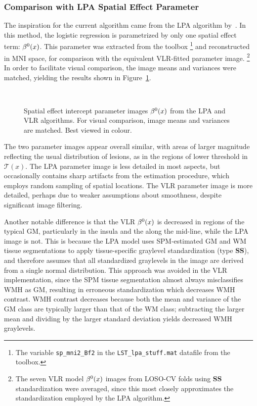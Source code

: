 \subsubsection{Comparison with LPA Spatial Effect Parameter}\label{sss:exp-beta-lpa}
The inspiration for the current algorithm came from the LPA algorithm by~\citeauthor{Schmidt2017}.
In this method, the logistic regression is parametrized by only one spatial effect term: $\beta^0(x)$.
This parameter was extracted from the toolbox%
\footnote{The variable \texttt{sp\_mni2\_Bf2}
  in the \texttt{LST\_lpa\_stuff.mat} datafile from the toolbox.}
and reconstructed in MNI space, for comparison with the equivalent VLR-fitted parameter image.%
\footnote{The seven VLR model $\beta^0(x)$ images from LOSO-CV folds
  using \textbf{SS} standardization were averaged,
  since this most closely approximates the standardization employed by the LPA algorithm.}
In order to facilitate visual comparison, the image means and variances were matched,
yielding the results shown in Figure~\ref{fig:beta-lpa}.
\par
\begin{figure}
  \centering
  \\[0.5em]
  \caption{Spatial effect intercept parameter images $\beta^0(x)$ from the LPA and VLR algorithms.
    For visual comparison, image means and variances are matched. Best viewed in colour.}%
  \label{fig:beta-lpa}
\end{figure}
The two parameter images appear overall similar,
with areas of larger magnitude reflecting the usual distribution of lesions,
as in the regions of lower threshold in $\mathcal{T}(x)$.
The LPA parameter image is less detailed in most aspects,
but occasionally contains sharp artifacts from the estimation procedure,
which employs random sampling of spatial locations.
The VLR parameter image is more detailed, perhaps due to weaker assumptions about smoothness,
despite significant image filtering.
\par
Another notable difference is that the VLR $\beta^0(x)$ is decreased in regions of the typical GM,
particularly in the insula and the along the mid-line, while the LPA image is not.
This is because the LPA model uses SPM-estimated GM and WM tissue segmentations
to apply tissue-specific graylevel standardization (type \textbf{SS}), and therefore assumes that
all standardized graylevels in the image are derived from a single normal distribution.
This approach was avoided in the VLR implementation,
since the SPM tissue segmentation almost always misclassifies WMH as GM,
resulting in erroneous standardization which decreases WMH contrast.
WMH contrast decreases because both the mean and variance
of the GM class are typically larger than that of the WM class;
subtracting the larger mean and dividing by the larger standard deviation
yields decreased WMH graylevels.
